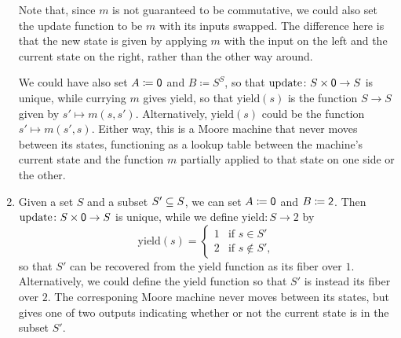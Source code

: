 \documentclass[Book-Poly]{subfiles}
\begin{document}
\begin{exercise}
\begin{solution}
\begin{enumerate}
    Note that, since $m$ is not guaranteed to be commutative, we could also set the update function to be $m$ with its inputs swapped.
    The difference here is that the new state is given by applying $m$ with the input on the left and the current state on the right, rather than the other way around.
    
    We could have also set $A \coloneqq \0$ and $B \coloneqq S^S$, so that $\text{update} \colon S \times \0 \to S$ is unique, while currying $m$ gives $\text{yield}$, so that $\text{yield}(s)$ is the function $S \to S$ given by $s' \mapsto m(s, s')$.
    Alternatively, $\text{yield}(s)$ could be the function $s' \mapsto m(s', s)$.
    Either way, this is a Moore machine that never moves between its states, functioning as a lookup table between the machine's current state and the function $m$ partially applied to that state on one side or the other.
    
    \item Given a set $S$ and a subset $S' \ss S$, we can set $A \coloneqq \0$ and $B \coloneqq \2$.
    Then $\text{update} \colon S \times \0 \to S$ is unique, while we define $\text{yield} \colon S \to 2$ by
    \[
        \text{yield}(s) =
        \begin{cases}
            1 & \text{if } s \in S' \\
            2 & \text{if } s \notin S',
        \end{cases}
    \]
    so that $S'$ can be recovered from the yield function as its fiber over $1$.
    Alternatively, we could define the yield function so that $S'$ is instead its fiber over $2$.
    The corresponing Moore machine never moves between its states, but gives one of two outputs indicating whether or not the current state is in the subset $S'$.
\end{enumerate}
\end{solution}
\end{exercise}
\end{document}
